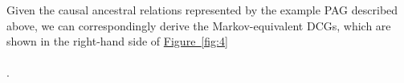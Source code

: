 \documentclass[twoside, 11pt]{article}
\newcommand{\stararrow}{%
\begin{tikzpicture}
    \draw [{Rays[n=6]}-{Straight Barb[length=2.5pt]}] (0,0) -- (0.5, 0);
\end{tikzpicture}
}
\newcommand{\tailcirc}{%
\begin{tikzpicture}[baseline=-3pt] 
    \draw [-{Circle[open]}] (0,0) -- (0.4, 0);
\end{tikzpicture}
}
\newcommand{\tailstar}{%
\begin{tikzpicture}[baseline=-3pt] 
    \draw [-{Rays[n=6]}] (0,0) -- (0.5, 0);
\end{tikzpicture}
}
\newcommand{\tailarrow}{%
\begin{tikzpicture}
    \draw [-{Straight Barb[length=2.5pt]}](0,0) -- (0.4, 0);
\end{tikzpicture}
}
\newcommand*{\figref}[2][]{%
  \hyperref[{fig:#2}]{%
    Figure~\ref*{fig:#2}%
    \ifx\\#1\\%
    \else
      #1%
    \fi
  }%
}
\newtheorem{definition}{Definition}
\begin{document}
\noindent Given the causal ancestral relations represented by the example PAG described above, we can correspondingly derive the Markov-equivalent DCGs, which are shown in the right-hand side of \figref[]{4}.






    

\end{document}
